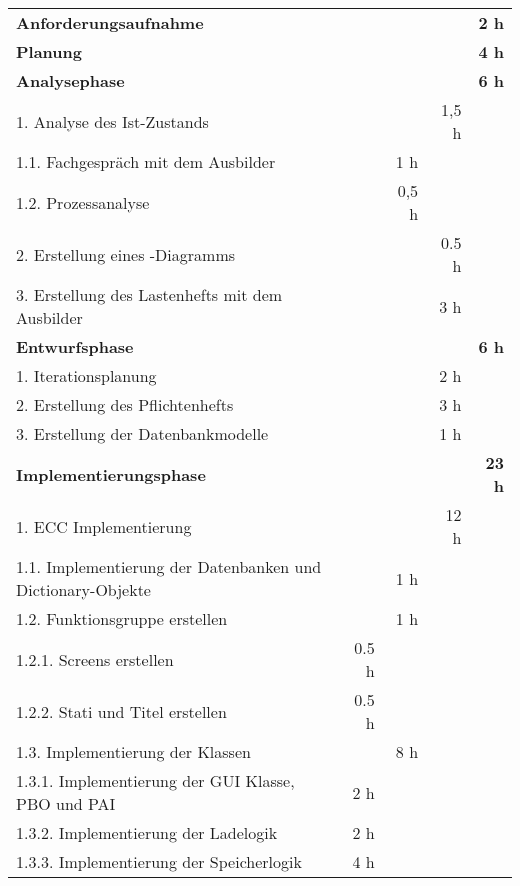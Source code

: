 \begin{tabu}{lrrrr}
\rowfont{\bfseries\leavevmode\color{headingfont}}\textbf{Anforderungsaufnahme} & \textbf{} & \textbf{} & \textbf{} & \textbf{2 h} \\
\rowfont{\bfseries\leavevmode\color{headingfont}}\textbf{Planung} & \textbf{} & \textbf{} & \textbf{} & \textbf{4 h} \\
\rowfont{\bfseries\leavevmode\color{headingfont}}\textbf{Analysephase} & \textbf{} & \textbf{} & \textbf{} & \textbf{6 h} \\
1. Analyse des Ist-Zustands & & & 1,5 h & \\
1.1. Fachgespräch mit dem Ausbilder & & 1 h & & \\
1.2. Prozessanalyse & & 0,5 h & & \\
2. Erstellung eines -Diagramms & & & 0.5 h & \\
3. Erstellung des Lastenhefts mit dem Ausbilder & & & 3 h & \\
\rowfont{\color{headingfont}}\textbf{Entwurfsphase} & \textbf{} & \textbf{} & \textbf{} & \textbf{6 h} \\
1. Iterationsplanung & & & 2 h & \\
2. Erstellung des Pflichtenhefts & & & 3 h & \\
3. Erstellung der Datenbankmodelle & & & 1 h & \\
\rowfont{\color{headingfont}}\textbf{Implementierungsphase} & \textbf{} & \textbf{} & \textbf{} & \textbf{23 h} \\
1. ECC Implementierung & & & 12 h & \\
1.1. Implementierung der Datenbanken und Dictionary-Objekte & & 1 h & & \\
1.2. Funktionsgruppe erstellen & & 1 h & \\
1.2.1. Screens erstellen & 0.5 h & & & \\
1.2.2. Stati und Titel erstellen & 0.5 h & & & \\
1.3. Implementierung der Klassen & & 8 h & & \\
1.3.1. Implementierung der GUI Klasse, PBO und PAI & 2 h & & & \\
1.3.2. Implementierung der Ladelogik & 2 h & & & \\
1.3.3. Implementierung der Speicherlogik & 4 h & & & \\

\end{tabu}
